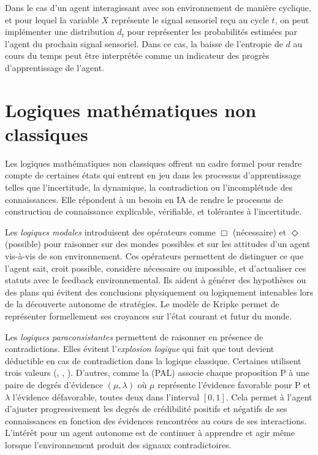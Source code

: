 Dans le cas d'un agent interagissant avec son environnement de manière cyclique, et pour lequel la variable $X$ représente le signal sensoriel reçu au cycle $t$, on peut implémenter une distribution $d_t$ pour représenter les probabilités estimées par l'agent du prochain signal sensoriel. 
Dans ce cas, la baisse de l'entropie de $d$ au cours du temps peut être interprétée comme un indicateur des progrès d'apprentissage de l'agent. 



\section{Logiques mathématiques non classiques}

\noindent
Les logiques mathématiques non classiques offrent un cadre formel pour rendre compte de certaines états qui entrent en jeu dans les processus d'apprentissage telles que l'incertitude, la dynamique, la contradiction ou l'incomplétude des connaissances. 
Elle répondent à un besoin en IA de rendre le processus de construction de connaissance explicable, vérifiable, et tolérantes à l'incertitude.  

Les \emph{logiques modales} introduisent des opérateurs comme $\Box$ (nécessaire) et $\Diamond$ (possible) pour raisonner sur des mondes possibles et sur les attitudes d’un agent vis-à-vis de son environnement. 
Ces opérateurs permettent de distinguer ce que l’agent sait, croit possible, considère nécessaire ou impossible, et d’actualiser ces statuts avec le feedback environnemental.
Ils aident à générer des hypothèses ou des plans qui évitent des conclusions physiquement ou logiquement intenables lors de la découverte autonome de stratégies.
Le modèle de Kripke permet de représenter formellement ses croyances sur l’état courant et futur du monde.

Les \emph{logiques paraconsistantes} permettent de raisonner en présence de contradictions. 
Elles évitent l'\emph{explosion logique} qui fait que tout devient déductible en cas de contradiction dans la logique classique.
Certaines utilisent trois valeurs (, , ).
D'autres, comme la  (PAL) associe chaque proposition P à une paire de degrés d'évidence $(\mu, \lambda)$ où $\mu$ représente l'évidence favorable pour P et $\lambda$ l'évidence défavorable, toutes deux dans l'interval $[0,1]$.
Cela permet à l'agent d'ajuster progressivement les degrés de crédibilité positifs et négatifs de ses connaissances en fonction des évidences rencontrées au cours de ses interactions.  
L’intérêt pour un agent autonome est de continuer à apprendre et agir même lorsque l’environnement produit des signaux contradictoires.

